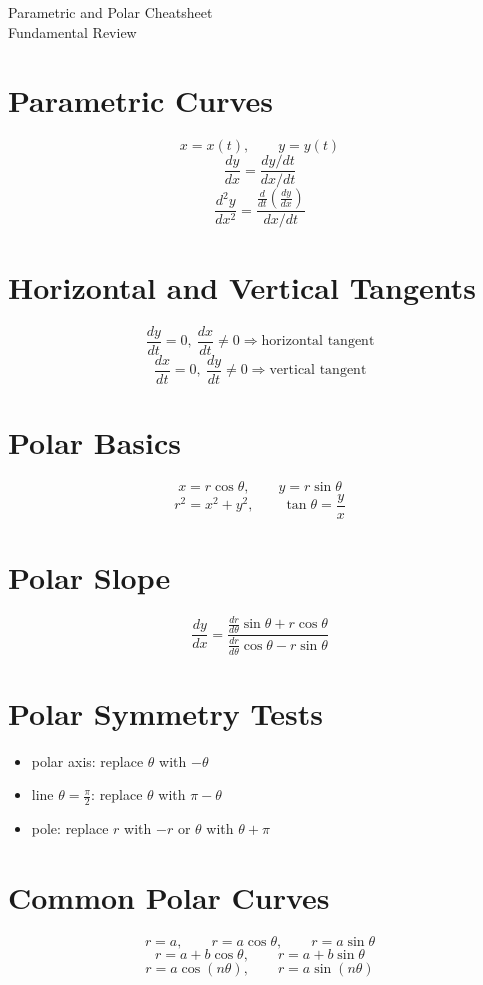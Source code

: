 \documentclass[11pt]{article}
\begin{document}
\begin{center}
{\LARGE Parametric and Polar Cheatsheet}\\[0.4em]
{\large Fundamental Review}
\end{center}

\section*{Parametric Curves}
\[
x=x(t),\qquad y=y(t)
\]
\[
\frac{dy}{dx}=\frac{dy/dt}{dx/dt}
\]
\[
\frac{d^2y}{dx^2}=\frac{\frac{d}{dt}\left(\frac{dy}{dx}\right)}{dx/dt}
\]

\section*{Horizontal and Vertical Tangents}
\[
\frac{dy}{dt}=0,\ \frac{dx}{dt}\ne 0 \Rightarrow \text{horizontal tangent}
\]
\[
\frac{dx}{dt}=0,\ \frac{dy}{dt}\ne 0 \Rightarrow \text{vertical tangent}
\]

\section*{Polar Basics}
\[
x=r\cos\theta,\qquad y=r\sin\theta
\]
\[
r^2=x^2+y^2,\qquad \tan\theta=\frac{y}{x}
\]

\section*{Polar Slope}
\[
\frac{dy}{dx}=
\frac{\frac{dr}{d\theta}\sin\theta+r\cos\theta}
{\frac{dr}{d\theta}\cos\theta-r\sin\theta}
\]

\section*{Polar Symmetry Tests}
\begin{itemize}
  \item polar axis: replace $\theta$ with $-\theta$
  \item line $\theta=\frac{\pi}{2}$: replace $\theta$ with $\pi-\theta$
  \item pole: replace $r$ with $-r$ or $\theta$ with $\theta+\pi$
\end{itemize}

\section*{Common Polar Curves}
\[
r=a,\qquad r=a\cos\theta,\qquad r=a\sin\theta
\]
\[
r=a+b\cos\theta,\qquad r=a+b\sin\theta
\]
\[
r=a\cos(n\theta),\qquad r=a\sin(n\theta)
\]
\end{document}
